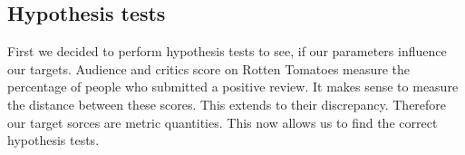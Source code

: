 \documentclass{article}
\begin{document}

\subsection{Hypothesis tests}
    First we decided to perform hypothesis tests to see, if our parameters influence our targets. Audience and critics score on Rotten Tomatoes measure the percentage of people who submitted a positive review. It makes sense to measure the distance between these scores. This extends to their discrepancy. Therefore our target sorces are metric quantities. This now allows us to find the correct hypothesis tests.
\end{document}
